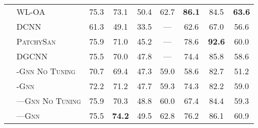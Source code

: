 \documentclass[letterpaper]{article}
\theoremstyle{definition}
\begin{document}
\begin{table*}[t]
\begin{tabular}{@{}clccccccc@{}}
		  & \textsc{WL-OA}                     & 75.3           & 73.1                & 50.4                  & 62.7                & \textbf{86.1}     & 84.5               & \textbf{63.6}       
		\\
		\cmidrule{2-9}
		\multirow{7}{*}{\rotatebox{90}{GNN}}
		  & \textsc{DCNN}                      & 61.3           & 49.1                & 33.5                  & ---                 & 62.6              & 67.0               & 56.6                \\
		  & \textsc{PatchySan}                 & 75.9           & 71.0                & 45.2                  & ---                 & 78.6              & \textbf{92.6}      & 60.0                \\
		  & \textsc{DGCNN}                     & 75.5           & 70.0                & 47.8                  & ---                 & 74.4              & 85.8               & 58.6                \\     
		\cmidrule{2-9}   
												
		  & \textsc{-Gnn No Tuning}         & 70.7           & 69.4                & 47.3                  & 59.0                & 58.6              & 82.7               & 51.2                \\
		  & \textsc{-Gnn}                   & 72.2           & 71.2                & 47.7                  & 59.3                & 74.3              & 82.2               & 59.0                \\
		  & \textsc{---Gnn No Tuning} & 75.9           & 70.3                & 48.8                  & 60.0                & 67.4              & 84.4               & 59.3                \\
		  & \textsc{---Gnn}           & 75.5           & \textbf{74.2}       & 49.5                  & 62.8                & 76.2              & 86.1               & 60.9                \\
\bottomrule
	\end{tabular}
\end{table*}
\end{document}
